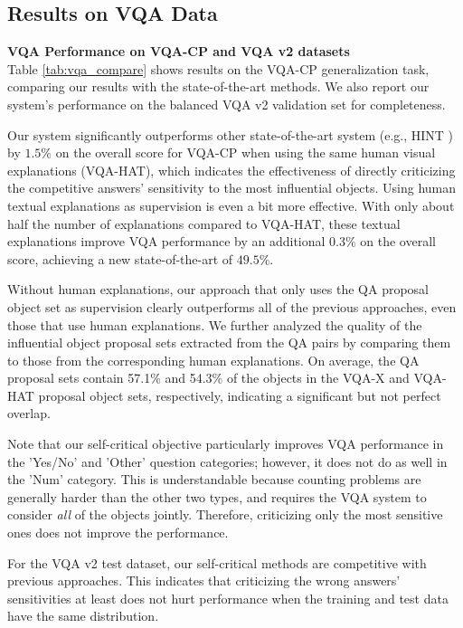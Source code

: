 \documentclass{article}
\begin{document}
\subsection{Results on VQA Data}
\noindent\textbf{VQA Performance on VQA-CP and VQA v2 datasets}\\
Table \ref{tab:vqa_compare} shows results on the VQA-CP generalization task, comparing our results with the state-of-the-art methods. We also report our system's performance on the balanced VQA v2 validation set for completeness.  

Our system significantly outperforms other state-of-the-art system (e.g., HINT \cite{selvaraju2019taking}) by $1.5\%$ on the overall score for VQA-CP when using the same human visual explanations (VQA-HAT), which indicates the effectiveness of directly criticizing the competitive answers' sensitivity to the most influential objects. Using human textual explanations as supervision is even a bit more effective. With only about half the number of explanations compared to VQA-HAT, these textual explanations improve VQA performance by an additional $0.3\%$ on the overall score, achieving a new state-of-the-art of $49.5\%$. 

Without human explanations, our approach that only uses the QA proposal object set as supervision clearly outperforms all of the previous approaches, even those that use human explanations.  We further analyzed the quality of the influential object proposal sets extracted from the QA pairs by comparing them to those from the corresponding human explanations. On average, the QA proposal sets contain  57.1\% and 54.3\%  of the objects in the VQA-X and VQA-HAT proposal object sets, respectively, indicating a significant but not perfect overlap.

Note that our self-critical objective particularly improves VQA performance in the 'Yes/No' and 'Other'  question categories; however, it does not do as well in the 'Num' category. This is understandable because counting problems are generally harder than the other two types, and requires the VQA system to consider {\it all} of the objects jointly. Therefore, criticizing only the most sensitive ones does not improve the performance.

For the VQA v2 test dataset, our self-critical methods are competitive with previous approaches. This indicates that criticizing the wrong answers' sensitivities at least does not hurt performance when the training and test data have the same distribution.
\end{document}
